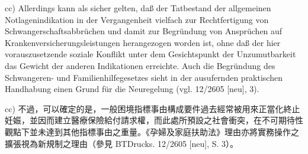 \documentclass[12pt]{article}
\begin{document}
\begin{sourcepara}[title={原文E.231}]
cc) Allerdings kann als sicher gelten, daß der Tatbestand der allgemeinen Notlagenindikation in der Vergangenheit vielfach zur Rechtfertigung von Schwangerschaftsabbrüchen und damit zur Begründung von Ansprüchen auf Krankenversicherungsleistungen herangezogen worden ist, ohne daß der hier vorauszusetzende soziale Konflikt unter dem Gesichtspunkt der Unzumutbarkeit das Gewicht der anderen Indikationen erreichte. Auch die Begründung des Schwangeren- und Familienhilfegesetzes sieht in der ausufernden praktischen Handhabung einen Grund für die Neuregelung (vgl. \abbrBTDrucks{} 12/2605 [neu], \abbrS{} 3).
\end{sourcepara}
\begin{transpara}
cc) 不過，可以確定的是，一般困境指標事由構成要件過去經常被用來正當化終止妊娠，並因而建立醫療保險給付請求權，而此處所預設之社會衝突，在不可期待性觀點下並未達到其他指標事由之重量。《孕婦及家庭扶助法》理由亦將實務操作之擴張視為新規制之理由（參見 BTDrucks. 12/2605 [neu], S. 3）。
\end{transpara}
\end{document}

